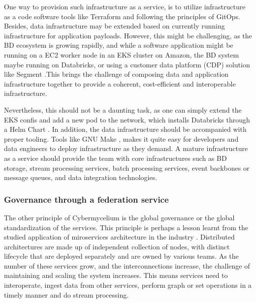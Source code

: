\documentclass[review]{elsarticle}
\begin{document}
One way to provision such infrastructure as a service, is to utilize infrastructure as a code software tools like Terraform \cite{Terraform} and following the principles of GitOps. Besides, data infrastructure may be extended based on currently running infrastructure for application payloads. However, this might be challenging, as the BD ecosystem is growing rapidly, and while a software application might be running on a EC2 worker node in an EKS cluster on Amazon, the BD system maybe running on Databricks, or using a customer data platform (CDP) solution like Segment \cite{Segment}.This brings the challenge of composing data and application infrastructure together to provide a coherent, cost-efficient and interoperable infrastructure.

Nevertheless, this should not be a daunting task, as one can simply extend the EKS confis and add a new pod to the network, which installs Databricks through a Helm Chart \cite{Helm}. In addition, the data infrastructure should be accompanied with proper tooling. Tools like GNU Make \cite{Make}, makes it quite easy for developers and data engineers to deploy infrastructure as they demand.
A mature infrastructure as a service should provide the team with core infrastructures such as BD storage, stream processing services, batch processing services, event backbones or message queues, and data integration technologies.

\subsubsection{Governance through a federation service}

The other principle of Cybermycelium is the global governance or the global standardization of the services. This principle is perhaps a lesson learnt from the studied application of miroservices architecture in the industry \cite{alshuqayran2016systematic}. Distributed architectures are made up of independent collection of nodes, with distinct lifecycle that are deployed separately and are owned by various teams. As the number of these services grow, and the interconnections increase, the challenge of maintaining and scaling the system increases. This means services need to interoperate, ingest data from other services, perform graph or set operations in a timely manner and do stream processing.
\end{document}
